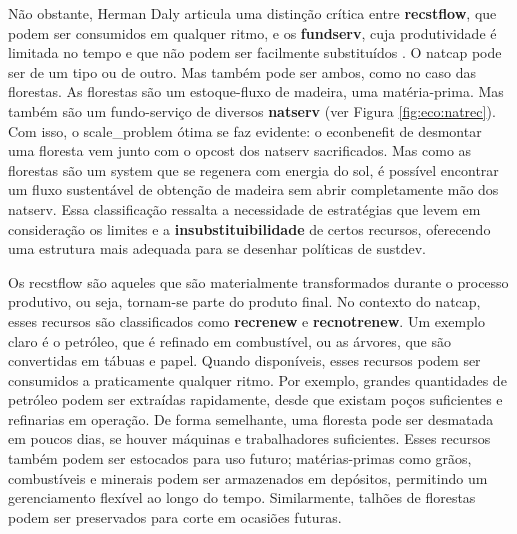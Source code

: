 \documentclass[./main.tex]{subfiles}
\begin{document}
\par Não obstante, Herman Daly articula uma distinção crítica entre \textbf{\gls{recstflow}}, que podem ser consumidos em qualquer ritmo, e os \textbf{\gls{fundserv}}, cuja produtividade é limitada no tempo e que não podem ser facilmente substituídos \cite{daly2011}. O \gls{natcap} pode ser de um tipo ou de outro. Mas também pode ser ambos, como no caso das florestas. As florestas são um estoque-fluxo de madeira, uma matéria-prima. Mas também são um fundo-serviço de diversos \textbf{\gls{natserv}} (ver Figura \ref{fig:eco:natrec}). Com isso, o \gls{scale_problem} ótima se faz evidente: o \gls{econbenefit} de desmontar uma floresta vem junto com o \gls{opcost} dos \gls{natserv} sacrificados. Mas como as florestas são um \gls{system} que se regenera com energia do sol, é possível encontrar um fluxo sustentável de obtenção de madeira sem abrir completamente mão dos \gls{natserv}. Essa classificação ressalta a necessidade de estratégias que levem em consideração os limites e a \textbf{insubstituibilidade} de certos recursos, oferecendo uma estrutura mais adequada para se desenhar políticas de \gls{sustdev}.

\par Os \gls{recstflow} são aqueles que são materialmente transformados durante o processo produtivo, ou seja, tornam-se parte do produto final. No contexto do \gls{natcap}, esses recursos são classificados como \textbf{\gls{recrenew}} e \textbf{\gls{recnotrenew}}. Um exemplo claro é o petróleo, que é refinado em combustível, ou as árvores, que são convertidas em tábuas e papel. Quando disponíveis, esses recursos podem ser consumidos a praticamente qualquer ritmo. Por exemplo, grandes quantidades de petróleo podem ser extraídas rapidamente, desde que existam poços suficientes e refinarias em operação. De forma semelhante, uma floresta pode ser desmatada em poucos dias, se houver máquinas e trabalhadores suficientes. Esses recursos também podem ser estocados para uso futuro; matérias-primas como grãos, combustíveis e minerais podem ser armazenados em depósitos, permitindo um gerenciamento flexível ao longo do tempo. Similarmente, talhões de florestas podem ser preservados para corte em ocasiões futuras. 
\end{document}
